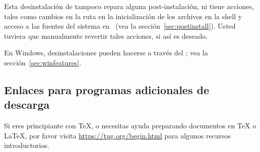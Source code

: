 \documentclass{article}
\begin{document}
Esta desinstalación de  tampoco repara alguna
post-instalación, ni tiene acciones, tales como cambios en
la ruta  en la inicialización de los archivos
en la shell y acceso a las fuentes del sistema en \TL\ (vea  la
sección~\ref{sec:postinstall}). Usted tuviera que manualmente revertir
tales acciones, si así es deseado.

En Windows,  desinstalaciones pueden hacerse a través del \GUI; vea la
sección~\ref{sec:winfeatures}.

\subsection{Enlaces para programas adicionales de descarga}

Si eres principiante con \TeX{}, o necesitas ayuda preparando
documentos en \TeX{} o \LaTeX{}, por favor visita
\url{https://tug.org/begin.html} para algunos recursos introductorios.
\end{document}
